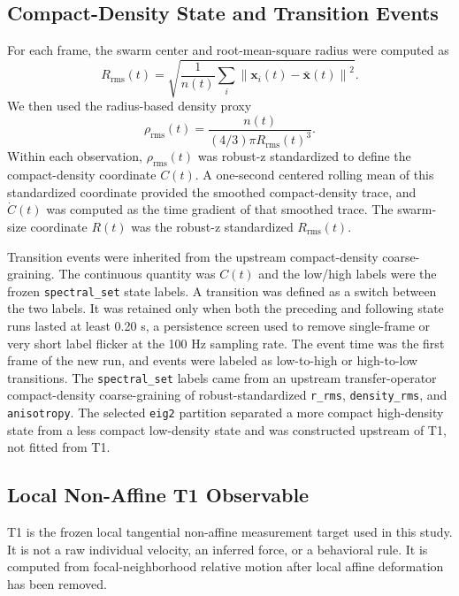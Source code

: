 \subsection{Compact-Density State and Transition Events}

For each frame, the swarm center and root-mean-square radius were computed as
\begin{equation}
R_{\mathrm{rms}}(t)=
\sqrt{
\frac{1}{n(t)}
\sum_i \left\|\mathbf{x}_i(t)-\bar{\mathbf{x}}(t)\right\|^2
}.
\end{equation}
We then used the radius-based density proxy
\begin{equation}
\rho_{\mathrm{rms}}(t)=
\frac{n(t)}{(4/3)\pi R_{\mathrm{rms}}(t)^3}.
\end{equation}
Within each observation, $\rho_{\mathrm{rms}}(t)$ was robust-z standardized to
define the compact-density coordinate $C(t)$. A one-second centered rolling
mean of this standardized coordinate provided the smoothed compact-density
trace, and $\dot{C}(t)$ was computed as the time gradient of that smoothed
trace. The swarm-size coordinate $R(t)$ was the robust-z standardized
$R_{\mathrm{rms}}(t)$.

Transition events were inherited from the upstream compact-density
coarse-graining. The continuous quantity was $C(t)$ and the low/high labels
were the frozen \texttt{spectral\_set} state labels. A transition was defined
as a switch between the two labels. It was retained only when both the
preceding and following state runs lasted at least 0.20 s, a persistence
screen used to remove single-frame or very short label flicker at the 100 Hz
sampling rate. The event time was the first frame of the new run, and events
were labeled as low-to-high or high-to-low transitions.
The \texttt{spectral\_set} labels came from an upstream transfer-operator
compact-density coarse-graining of robust-standardized \texttt{r\_rms},
\texttt{density\_rms}, and \texttt{anisotropy}. The selected \texttt{eig2}
partition separated a more compact high-density state from a less compact
low-density state and was constructed upstream of T1, not fitted from T1.

\subsection{Local Non-Affine T1 Observable}

T1 is the frozen local tangential non-affine measurement target used in this
study. It is not a raw individual velocity, an inferred force, or a behavioral
rule. It is computed from focal-neighborhood relative motion after local
affine deformation has been removed.

